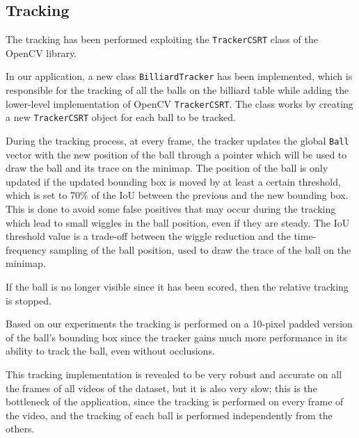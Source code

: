 \subsection{Tracking}
The tracking has been performed exploiting the \texttt{TrackerCSRT} class of the OpenCV library.

In our application, a new class \texttt{BilliardTracker} has been implemented, which is responsible for the tracking of all the balls on the billiard table while adding the lower-level implementation of OpenCV \texttt{TrackerCSRT}. The class works by creating a new \texttt{TrackerCSRT} object for each ball to be tracked.

During the tracking process, at every frame, the tracker updates the global \texttt{Ball} vector with the new position of the ball through a pointer which will be used to draw the ball and its trace on the minimap.
The position of the ball is only updated if the updated bounding box is moved by at least a certain threshold, which is set to 70\% of the IoU between the previous and the new bounding box. This is done to avoid some false positives that may occur during the tracking which lead to small wiggles in the ball position, even if they are steady.
The IoU threshold value is a trade-off between the wiggle reduction and the time-frequency sampling of the ball position, used to draw the trace of the ball on the minimap.

If the ball is no longer visible since it has been scored, then the relative tracking is stopped.

Based on our experiments the tracking is performed on a 10-pixel padded version of the ball's bounding box since the tracker gains much more performance in its ability to track the ball, even without occlusions.

This tracking implementation is revealed to be very robust and accurate on all the frames of all videos of the dataset, but it is also very slow; this is the bottleneck of the application, since the tracking is performed on every frame of the video, and the tracking of each ball is performed independently from the others.
